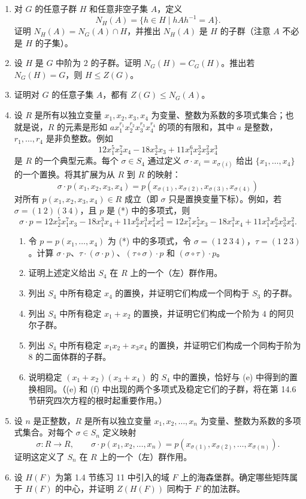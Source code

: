 \begin{enumerate}[label=\arabic*.]
  \[
    G_i=\{\sigma\in G\mid \sigma(i)=i\}
  \]
  （即 $i$ 在 $G$ 中的稳定子）。用群作用证明 $G_i$ 是 $G$ 的子群，并求 $|G_i|$。
  \item 对 $G$ 的任意子群 $H$ 和任意非空子集 $A$，定义
  \[
    N_H(A)=\{h\in H\mid hAh^{-1}=A\}.
  \]
  证明 $N_H(A)=N_G(A)\cap H$，并推出 $N_H(A)$ 是 $H$ 的子群（注意 $A$ 不必是 $H$ 的子集）。
  \item 设 $H$ 是 $G$ 中阶为 $2$ 的子群。证明 $N_G(H)=C_G(H)$。推出若 $N_G(H)=G$，则 $H\leq Z(G)$。
  \item 证明对 $G$ 的任意子集 $A$，都有 $Z(G)\leq N_G(A)$。
  \item 设 $R$ 是所有以独立变量 $x_1,x_2,x_3,x_4$ 为变量、整数为系数的多项式集合；也就是说，$R$ 的元素是形如 $a x_1^{r_1}x_2^{r_2}x_3^{r_3}x_4^{r_4}$ 的项的有限和，其中 $a$ 是整数，$r_1,\ldots,r_4$ 是非负整数。例如
  \[
    12x_1^5x_2^7x_4-18x_2^3x_3+11x_1^6x_2^3x_3^2x_4^3 \tag{*}
  \]
  是 $R$ 的一个典型元素。每个 $\sigma\in S_4$ 通过定义 $\sigma\cdot x_i=x_{\sigma(i)}$ 给出 $\{x_1,\ldots,x_4\}$ 的一个置换。将其扩展为从 $R$ 到 $R$ 的映射：
  \[
    \sigma\cdot p(x_1,x_2,x_3,x_4)=p(x_{\sigma(1)},x_{\sigma(2)},x_{\sigma(3)},x_{\sigma(4)})
  \]
  对所有 $p(x_1,x_2,x_3,x_4)\in R$ 成立（即 $\sigma$ 只是置换变量下标）。例如，若 $\sigma=(1\ 2)(3\ 4)$，且 $p$ 是 (*) 中的多项式，则
  \[
    \sigma\cdot p=12x_2^5x_1^7x_3-18x_1^3x_4+11x_2^6x_1^3x_4^2x_3^3
    =12x_1^7x_2^5x_3-18x_1^3x_4+11x_1^3x_2^6x_3^3x_4^2.
  \]
  \begin{enumerate}[label=(\alph*)]
    \item 令 $p=p(x_1,\ldots,x_4)$ 为 (*) 中的多项式，令 $\sigma=(1\ 2\ 3\ 4)$，$\tau=(1\ 2\ 3)$。计算 $\sigma\cdot p$、$\tau\cdot(\sigma\cdot p)$、$(\tau\circ\sigma)\cdot p$ 和 $(\sigma\circ\tau)\cdot p$。
    \item 证明上述定义给出 $S_4$ 在 $R$ 上的一个（左）群作用。
    \item 列出 $S_4$ 中所有稳定 $x_4$ 的置换，并证明它们构成一个同构于 $S_3$ 的子群。
    \item 列出 $S_4$ 中所有稳定 $x_1+x_2$ 的置换，并证明它们构成一个阶为 $4$ 的阿贝尔子群。
    \item 列出 $S_4$ 中所有稳定 $x_1x_2+x_3x_4$ 的置换，并证明它们构成一个同构于阶为 $8$ 的二面体群的子群。
    \item 说明稳定 $(x_1+x_2)(x_3+x_4)$ 的 $S_4$ 中的置换，恰好与 (e) 中得到的置换相同。（(e) 和 (f) 中出现的两个多项式及稳定它们的子群，将在第 14.6 节研究四次方程的根时起重要作用。）
  \end{enumerate}
  \item 设 $n$ 是正整数，$R$ 是所有以独立变量 $x_1,x_2,
  \ldots,x_n$ 为变量、整数为系数的多项式集合。对每个 $\sigma\in S_n$ 定义映射
  \[
    \sigma:R\to R,
    \qquad
    \sigma\cdot p(x_1,x_2,\ldots,x_n)=p(x_{\sigma(1)},x_{\sigma(2)},\ldots,x_{\sigma(n)}).
  \]
  证明这定义了 $S_n$ 在 $R$ 上的一个（左）群作用。
  \item 设 $H(F)$ 为第 1.4 节练习 11 中引入的域 $F$ 上的海森堡群。确定哪些矩阵属于 $H(F)$ 的中心，并证明 $Z(H(F))$ 同构于 $F$ 的加法群。
\end{enumerate}

